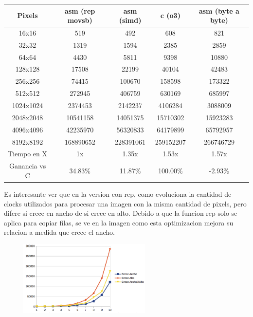\begin{table}[!htbp]
	\centering
	\footnotesize
	\begin{tabular}{| c | c | c | c | c |}
		\hline
Pixels &asm (rep movsb)& asm (simd) & c (o3) & asm (byte a byte)\\ \hline
16x16 & 519 & 492 & 608& 821 \\ \hline
32x32  &1319  & 1594 & 2385& 2859\\ \hline
64x64  & 4430 & 5811 & 9398& 10880 \\ \hline
128x128 & 17508 & 22199 & 40104& 42483 \\ \hline
256x256  & 74415  & 100670 & 158598& 173322\\ \hline
512x512   & 272945 & 406759 & 630169& 685997 \\ \hline
1024x1024 & 2374453 & 2142237 & 4106284& 3088009 \\ \hline
2048x2048  & 10541158  & 14051375 & 15710302& 15923283\\ \hline
4096x4096 & 42235970 & 56320833 & 64179899& 65792957 \\ \hline
8192x8192 & 168890652 & 228391061 & 259152207& 266746729 \\ \hline
Tiempo en X& 1x & 1.35x & 1.53x & 1.57x  \\ \hline
Ganancia vs C & 34.83\% & 11.87\%	& 100.00\% & -2.93\% \\ \hline

 
	\end{tabular}
\end{table}


Es interesante ver que en la version con rep, como evoluciona la cantidad de clocks utilizados para procesar una imagen con la misma cantidad de pixels, pero difere si crece en ancho de si crece en alto.
Debido a que la funcion rep solo se aplica para copiar filas, se ve en la imagen como esta optimizacion mejora su relacion a medida que crece el ancho.

\begin{figure}[!h]
	\centering
\includegraphics[width=250px]{imgs/crecimientocrop.png}
\end{figure}



